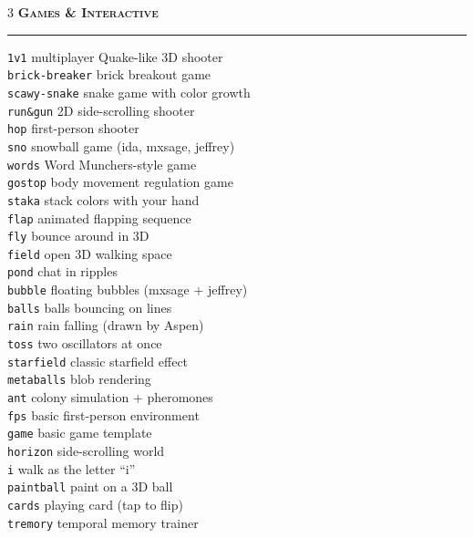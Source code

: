 \documentclass[10pt,letterpaper,twocolumn]{article}
\newcommand{\pe}[2]{\texttt{\color{acpurple}#1} #2}
\newcommand{\peh}[1]{\vspace{0.3em}\noindent\textbf{\textsc{#1}}\par\vspace{0.1em}\hrule\vspace{0.2em}}
\begin{document}
\begin{multicols}{3}
\peh{Games \& Interactive}
\pe{1v1}{multiplayer Quake-like 3D shooter}\\
\pe{brick-breaker}{brick breakout game}\\
\pe{scawy-snake}{snake game with color growth}\\
\pe{run\&gun}{2D side-scrolling shooter}\\
\pe{hop}{first-person shooter}\\
\pe{sno}{snowball game (ida, mxsage, jeffrey)}\\
\pe{words}{Word Munchers-style game}\\
\pe{gostop}{body movement regulation game}\\
\pe{staka}{stack colors with your hand}\\
\pe{flap}{animated flapping sequence}\\
\pe{fly}{bounce around in 3D}\\
\pe{field}{open 3D walking space}\\
\pe{pond}{chat in ripples}\\
\pe{bubble}{floating bubbles (mxsage + jeffrey)}\\
\pe{balls}{balls bouncing on lines}\\
\pe{rain}{rain falling (drawn by Aspen)}\\
\pe{toss}{two oscillators at once}\\
\pe{starfield}{classic starfield effect}\\
\pe{metaballs}{blob rendering}\\
\pe{ant}{colony simulation + pheromones}\\
\pe{fps}{basic first-person environment}\\
\pe{game}{basic game template}\\
\pe{horizon}{side-scrolling world}\\
\pe{i}{walk as the letter ``i''}\\
\pe{paintball}{paint on a 3D ball}\\
\pe{cards}{playing card (tap to flip)}\\
\pe{tremory}{temporal memory trainer}


\end{multicols}
\end{document}
